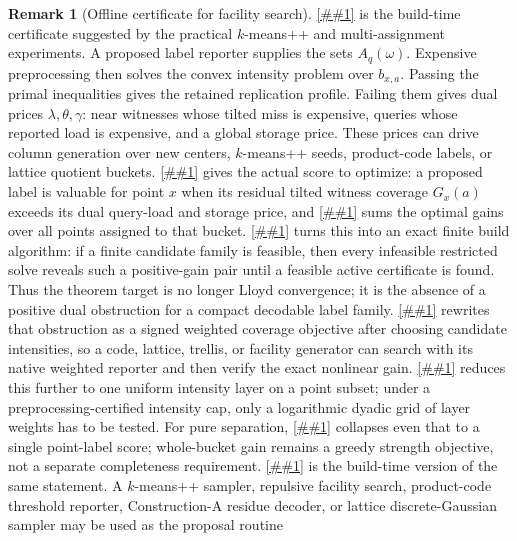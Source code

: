 \documentclass[10pt]{article}
\newcommand{\cref}[1]{\ref{##1}}
\newcommand{\Cref}[1]{\ref{##1}}
\theoremstyle{definition}
\newtheorem{remark}[theorem]{Remark}
\begin{document}
\begin{remark}[Offline certificate for facility search]
   \label{rem:rate-coverage-offline-certificate}
   \Cref{lem:finite-rate-coverage-convex} is the build-time certificate
   suggested by the practical \(k\)-means++ and multi-assignment experiments.
   A proposed label reporter supplies the sets \(A_q(\omega)\).  Expensive
   preprocessing then solves the convex intensity problem over \(b_{x,a}\).
   Passing the primal inequalities gives the retained replication profile.
   Failing them gives dual prices \(\lambda,\theta,\gamma\): near witnesses
   whose tilted miss is expensive, queries whose reported load is expensive,
   and a global storage price.  These prices can drive column generation over
   new centers, \(k\)-means++ seeds, product-code labels, or lattice quotient
   buckets.  \Cref{lem:rate-coverage-column-gain} gives the actual score to
   optimize: a proposed label is valuable for point \(x\) when its residual
   tilted witness coverage \(G_x(a)\) exceeds its dual query-load and storage
   price, and \cref{cor:whole-bucket-reduced-gain} sums the optimal gains over
   all points assigned to that bucket.  \Cref{lem:finite-rate-coverage-column-generation}
   turns this into an exact finite build algorithm: if a finite candidate family
   is feasible, then every infeasible restricted solve reveals such a
   positive-gain pair until a feasible active certificate is found.  Thus the
   theorem target is no longer Lloyd convergence; it is the absence of a
   positive dual obstruction for a compact decodable label family.
   \Cref{lem:reduced-gain-variational-separation} rewrites that obstruction as
   a signed weighted coverage objective after choosing candidate intensities,
   so a code, lattice, trellis, or facility generator can search with its native
   weighted reporter and then verify the exact nonlinear gain.
   \Cref{lem:layer-cake-reduced-gain-separation} reduces this further to one
   uniform intensity layer on a point subset; under a preprocessing-certified
   intensity cap, only a logarithmic dyadic grid of layer weights has to be
   tested.  For pure separation, \cref{cor:pointwise-reduced-cost-separation}
   collapses even that to a single point-label score; whole-bucket gain remains
   a greedy strength objective, not a separate completeness requirement.
   \Cref{lem:seeded-reduced-gain-search} is the build-time version of the same
   statement.  A \(k\)-means++ sampler, repulsive facility search, product-code
   threshold reporter, Construction-A residue decoder, or lattice
   discrete-Gaussian sampler may be used as the proposal routine

\end{remark}
\end{document}
